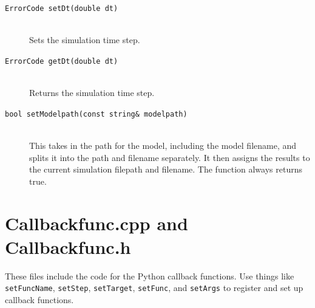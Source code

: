 \documentclass {scrbook}
\newcommand {\ttt} {\texttt}
\begin{document}
\begin{description}
\item[\ttt{ErrorCode setDt(double dt)}]
\hfill \\
Sets the simulation time step.

\item[\ttt{ErrorCode getDt(double dt)}]
\hfill \\
Returns the simulation time step.

\item[\ttt{bool setModelpath(const string\& modelpath)}]
\hfill \\
This takes in the path for the model, including the model filename, and splits it into the path and filename separately. It then assigns the results to the current simulation filepath and filename. The function always returns true.

\end{description}

\section{Callbackfunc.cpp and Callbackfunc.h}

These files include the code for the Python callback functions. Use things like \ttt{setFuncName}, \ttt{setStep}, \ttt{setTarget}, \ttt{setFunc}, and \ttt{setArgs} to register and set up callback functions.
\end{document}
